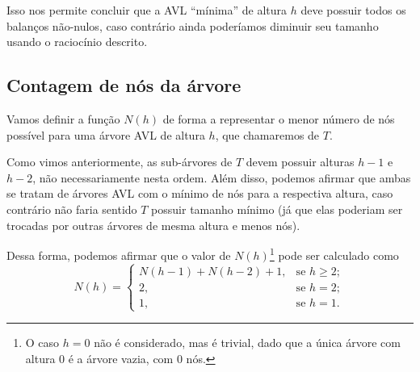 \documentclass[11pt,twoside]{article}
\theoremstyle{definition}
\begin{document}
      \begin{figure}[hbt]
        \caption{\label{fig:troca-sarv}}
        \centering
      \end{figure}

      Isso nos permite concluir que a AVL ``mínima'' de altura \( h \) deve possuir todos os balanços não-nulos, caso contrário ainda poderíamos diminuir seu tamanho usando o raciocínio descrito.

    \subsection{Contagem de nós da árvore}
      \label{str:contagem-nos}

      Vamos definir a função \( N(h) \) de forma a representar o menor número de nós possível para uma árvore AVL de altura \( h \), que chamaremos de \( T \).

      Como vimos anteriormente, as sub-árvores de \( T \) devem possuir alturas \( h-1 \) e \( h-2 \), não necessariamente nesta ordem. Além disso, podemos afirmar que ambas se tratam de árvores AVL com o mínimo de nós para a respectiva altura, caso contrário não faria sentido \( T \) possuir tamanho mínimo (já que elas poderiam ser trocadas por outras árvores de mesma altura e menos nós).

      Dessa forma, podemos afirmar que o valor de \( N(h) \)\footnote{O caso \( h = 0 \) não é considerado, mas é trivial, dado que a única árvore com altura 0 é a árvore vazia, com 0 nós.} pode ser calculado como \[ N(h) = \begin{cases}
          N(h-1) + N(h-2) + 1, & \text{se } h \geq 2; \\
          2                  , & \text{se } h = 2;    \\
          1                  , & \text{se } h = 1.
        \end{cases} \]
\end{document}
